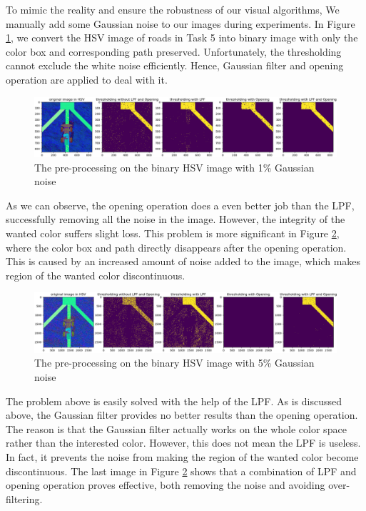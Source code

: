 To mimic the reality and ensure the robustness of our visual algorithms, We manually add some Gaussian noise to our images during experiments. In Figure \ref{fig:exp1}, we convert the HSV image of roads in Task 5 into binary image with only the color box and corresponding path preserved. Unfortunately, the thresholding cannot exclude the white noise efficiently. Hence, Gaussian filter and opening operation are applied to deal with it. 

\begin{figure}[htbp]
    \centering
    \includegraphics[width=14cm]{implementation/img_shu/experiment1.png}
    \caption{The pre-processing on the binary HSV image with 1\% Gaussian noise}
    \label{fig:exp1}
\end{figure}

As we can observe, the opening operation does a even better job than the LPF, successfully removing all the noise in the image. However, the integrity of the wanted color suffers slight loss. This problem is more significant in Figure \ref{fig:exp2}, where the color box and path directly disappears after the opening operation. This is caused by an increased amount of noise added to the image, which makes region of the wanted color discontinuous.

\begin{figure}[htbp]
    \centering
    \includegraphics[width=14cm]{implementation/img_shu/experiment2.png}
    \caption{The pre-processing on the binary HSV image with 5\% Gaussian noise}
    \label{fig:exp2}
\end{figure}

The problem above is easily solved with the help of the LPF. As is discussed above, the Gaussian filter provides no better results than the opening operation. The reason is that the Gaussian filter actually works on the whole color space rather than the interested color. However, this does not mean the LPF is useless. In fact, it prevents the noise from making the region of the wanted color become discontinuous. The last image in Figure \ref{fig:exp2} shows that a combination of LPF and opening operation proves effective, both removing the noise and avoiding over-filtering.

